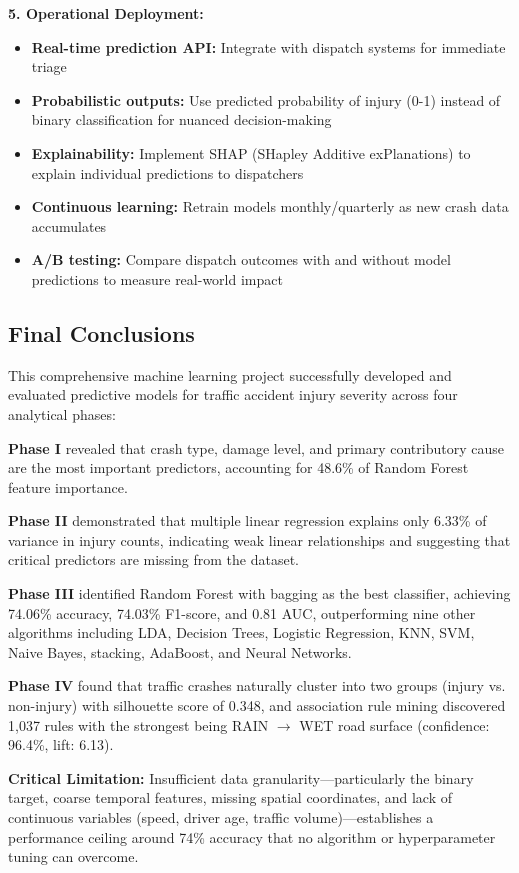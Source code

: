 \documentclass[12pt,man]{apa7}
\begin{document}
\textbf{5. Operational Deployment:}
\begin{itemize}
    \item \textbf{Real-time prediction API:} Integrate with dispatch systems for immediate triage
    \item \textbf{Probabilistic outputs:} Use predicted probability of injury (0-1) instead of binary classification for nuanced decision-making
    \item \textbf{Explainability:} Implement SHAP (SHapley Additive exPlanations) to explain individual predictions to dispatchers
    \item \textbf{Continuous learning:} Retrain models monthly/quarterly as new crash data accumulates
    \item \textbf{A/B testing:} Compare dispatch outcomes with and without model predictions to measure real-world impact
\end{itemize}

\subsection{Final Conclusions}

This comprehensive machine learning project successfully developed and evaluated predictive models for traffic accident injury severity across four analytical phases:

\textbf{Phase I} revealed that crash type, damage level, and primary contributory cause are the most important predictors, accounting for 48.6\% of Random Forest feature importance.

\textbf{Phase II} demonstrated that multiple linear regression explains only 6.33\% of variance in injury counts, indicating weak linear relationships and suggesting that critical predictors are missing from the dataset.

\textbf{Phase III} identified Random Forest with bagging as the best classifier, achieving 74.06\% accuracy, 74.03\% F1-score, and 0.81 AUC, outperforming nine other algorithms including LDA, Decision Trees, Logistic Regression, KNN, SVM, Naive Bayes, stacking, AdaBoost, and Neural Networks.

\textbf{Phase IV} found that traffic crashes naturally cluster into two groups (injury vs. non-injury) with silhouette score of 0.348, and association rule mining discovered 1,037 rules with the strongest being RAIN $\rightarrow$ WET road surface (confidence: 96.4\%, lift: 6.13).

\textbf{Critical Limitation:} Insufficient data granularity—particularly the binary target, coarse temporal features, missing spatial coordinates, and lack of continuous variables (speed, driver age, traffic volume)—establishes a performance ceiling around 74\% accuracy that no algorithm or hyperparameter tuning can overcome.
\end{document}

